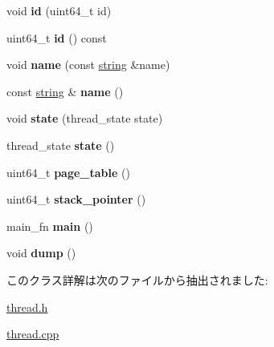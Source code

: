 \begin{DoxyCompactItemize}
\item 
\hypertarget{classthread_a72727217c70fb64523bf4d367eae1761}{}void {\bfseries id} (uint64\+\_\+t id)\label{classthread_a72727217c70fb64523bf4d367eae1761}

\item 
\hypertarget{classthread_ae9adf5b21b7271d8db735b79e6fdd1d4}{}uint64\+\_\+t {\bfseries id} () const \label{classthread_ae9adf5b21b7271d8db735b79e6fdd1d4}

\item 
\hypertarget{classthread_ab816aaeb5b728e5d15eb4e064ece25b0}{}void {\bfseries name} (const \hyperlink{classstring}{string} \&name)\label{classthread_ab816aaeb5b728e5d15eb4e064ece25b0}

\item 
\hypertarget{classthread_ab04013e3e679efdebb762afd77edf10e}{}const \hyperlink{classstring}{string} \& {\bfseries name} ()\label{classthread_ab04013e3e679efdebb762afd77edf10e}

\item 
\hypertarget{classthread_a75bf27fd88692ce8a30ca04e3c397681}{}void {\bfseries state} (thread\+\_\+state state)\label{classthread_a75bf27fd88692ce8a30ca04e3c397681}

\item 
\hypertarget{classthread_a3bbc0f9939912ffb6d31439e36d09e94}{}thread\+\_\+state {\bfseries state} ()\label{classthread_a3bbc0f9939912ffb6d31439e36d09e94}

\item 
\hypertarget{classthread_a2c10391e5b23ac4ff0ff99765bd5728d}{}uint64\+\_\+t {\bfseries page\+\_\+table} ()\label{classthread_a2c10391e5b23ac4ff0ff99765bd5728d}

\item 
\hypertarget{classthread_a813caa9cffcc7c21008e62235de71b54}{}uint64\+\_\+t {\bfseries stack\+\_\+pointer} ()\label{classthread_a813caa9cffcc7c21008e62235de71b54}

\item 
\hypertarget{classthread_aa4a8c5526714238ea8890badce737c08}{}main\+\_\+fn {\bfseries main} ()\label{classthread_aa4a8c5526714238ea8890badce737c08}

\item 
\hypertarget{classthread_a4b78d34fbeff62ace13a4e9a6d4515f4}{}void {\bfseries dump} ()\label{classthread_a4b78d34fbeff62ace13a4e9a6d4515f4}

\end{DoxyCompactItemize}


このクラス詳解は次のファイルから抽出されました\+:\begin{DoxyCompactItemize}
\item 
\hyperlink{thread_8h}{thread.\+h}\item 
\hyperlink{thread_8cpp}{thread.\+cpp}\end{DoxyCompactItemize}
